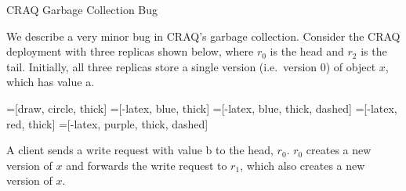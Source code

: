 \documentclass[12pt]{article}
\begin{document}
\begin{center}
  \Large CRAQ Garbage Collection Bug
\end{center}

We describe a very minor bug in CRAQ's garbage collection. Consider the CRAQ
deployment with three replicas shown below, where $r_0$ is the head and $r_2$
is the tail. Initially, all three replicas store a single version (i.e.\
version $0$) of object $x$, which has value a.

=[draw, circle, thick]
=[-latex, blue, thick]
=[-latex, blue, thick, dashed]
=[-latex, red, thick]
=[-latex, purple, thick, dashed]

\newcommand{\drawchain}{
  \node[replica] (r0) at (0, 0) {$r_0$};
  \node[replica] (r1) at (1, 0) {$r_1$};
  \node[replica] (r2) at (2, 0) {$r_2$};
}

\newcommand{\oneversion}[3]{
  \begin{tabular}{|l|l|l|}
    \hline
    $#1$ & $#2$ & #3 \\\hline
  \end{tabular}
}

\newcommand{\twoversions}[6]{
  \begin{tabular}{|l|l|l|}
    \hline
    $#1$ & $#2$ & #3 \\\hline
    $#4$ & $#5$ & #6 \\\hline
  \end{tabular}
}

\begin{center}
\end{center}

A client sends a write request with value b to the head, $r_0$. $r_0$ creates a
new version of $x$ and forwards the write request to $r_1$, which also creates
a new version of $x$.
\begin{center}
\end{center}
\end{document}
